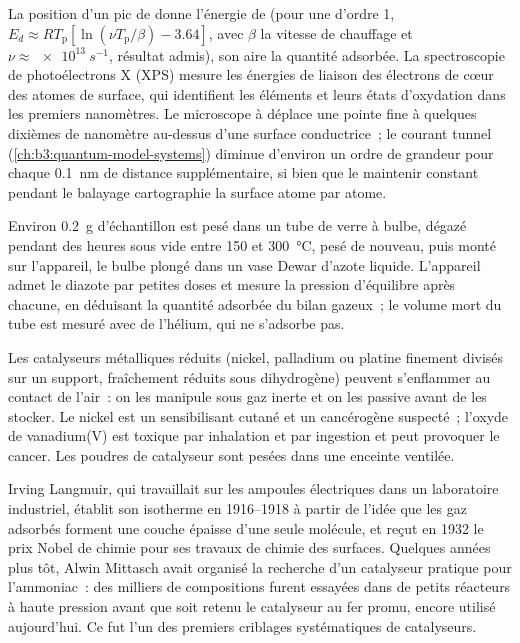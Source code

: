 La position d'un pic de  donne l'énergie de  (pour
une  d'ordre 1,
$E_d \approx RT_{\mathrm p}[\ln(\nu T_{\mathrm p}/\beta) - 3.64]$, avec
$\beta$ la vitesse de chauffage et $\nu \approx \qty{e13}{s^{-1}}$,
résultat admis), son aire la quantité adsorbée. La spectroscopie de
photoélectrons X (XPS) mesure les énergies de liaison des électrons de
cœur des atomes de surface, qui identifient les éléments et leurs états
d'oxydation dans les premiers nanomètres. Le microscope à 
déplace une pointe fine à quelques dixièmes de nanomètre au-dessus d'une
surface conductrice~; le courant tunnel
(\cref{ch:b3:quantum-model-systems}) diminue d'environ un ordre de
grandeur pour chaque \qty{0.1}{nm} de distance supplémentaire, si bien
que le maintenir constant pendant le balayage cartographie la surface
atome par atome.

\begin{inthelab}
Environ \qty{0.2}{g} d'échantillon est pesé dans un tube de verre à
bulbe, dégazé pendant des heures sous vide entre 150 et
\qty{300}{\celsius}, pesé de nouveau, puis monté sur l'appareil, le bulbe
plongé dans un vase Dewar d'azote liquide. L'appareil admet le diazote
par petites doses et mesure la pression d'équilibre après chacune, en
déduisant la quantité adsorbée du bilan gazeux~; le volume mort du tube
est mesuré avec de l'hélium, qui ne s'adsorbe pas.
\end{inthelab}

\begin{safety}{}
Les catalyseurs métalliques réduits (nickel, palladium ou platine
finement divisés sur un support, fraîchement réduits sous dihydrogène)
peuvent s'enflammer au contact de l'air~: on les manipule sous gaz inerte
et on les passive avant de les stocker. Le nickel est un sensibilisant
cutané et un cancérogène suspecté~; l'oxyde de vanadium(V) est toxique
par inhalation et par ingestion et peut provoquer le cancer. Les poudres
de catalyseur sont pesées dans une enceinte ventilée.
\end{safety}

\begin{history}
Irving Langmuir, qui travaillait sur les ampoules électriques dans un
laboratoire industriel, établit son isotherme en 1916--1918 à partir de
l'idée que les gaz adsorbés forment une couche épaisse d'une seule
molécule, et reçut en 1932 le prix Nobel de chimie pour ses travaux de
chimie des surfaces. Quelques années plus tôt, Alwin Mittasch avait
organisé la recherche d'un catalyseur pratique pour l'ammoniac~: des
milliers de compositions furent essayées dans de petits réacteurs à
haute pression avant que soit retenu le catalyseur au fer promu, encore
utilisé aujourd'hui. Ce fut l'un des premiers criblages systématiques de
catalyseurs.
\end{history}

